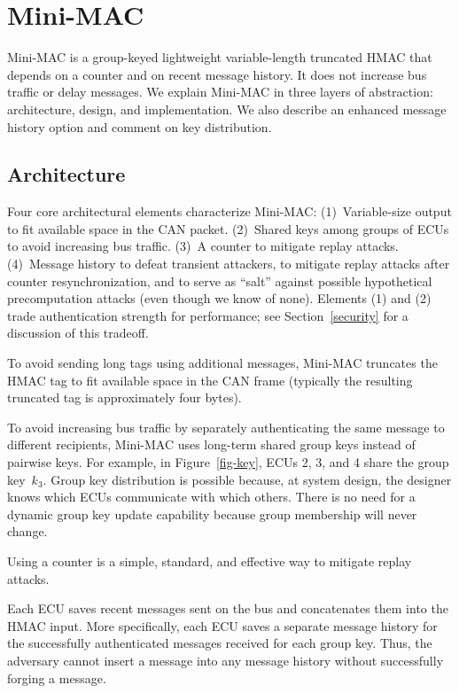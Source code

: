 \section{Mini-MAC}
\label{mini-mac}

Mini-MAC is a group-keyed lightweight variable-length truncated HMAC that
depends on a counter and on recent message history.  It does not increase
bus traffic or delay messages.  We explain Mini-MAC in three layers
of abstraction: architecture, design, and  implementation.
We also describe an enhanced message history option
and comment on key distribution.

\subsection{Architecture}
\label{arch}

Four core architectural elements characterize Mini-MAC:
(1)~Variable-size output to fit available space in the CAN packet.
(2)~Shared keys among groups of ECUs to avoid increasing bus traffic.
(3)~A counter to mitigate replay attacks.
(4)~Message history to defeat transient attackers, 
to mitigate replay attacks after counter resynchronization, 
and to serve as ``salt'' against possible hypothetical precomputation attacks 
(even though we know of none).
Elements (1) and (2) trade authentication strength for performance;  see
Section~\ref{security} for a discussion of this tradeoff.

To avoid sending long tags using additional messages, Mini-MAC truncates the
HMAC tag to fit available space in the CAN frame 
(typically the resulting truncated tag is approximately four bytes).  

To avoid increasing bus traffic by separately authenticating the same message to different recipients, 
Mini-MAC uses long-term shared group keys instead of pairwise keys.  For example, in Figure~\ref{fig-key}, ECUs
2, 3, and 4 share the group key~$k_3$.
Group key distribution is possible because, at system design, the designer knows which ECUs communicate with which others. 
There is no need for a dynamic group key update capability because group membership will never change.

Using a counter is a simple, standard, and effective way to mitigate replay attacks.  

Each ECU saves recent messages sent on the bus  and concatenates them into the HMAC input. 
More specifically, each ECU saves a separate message history for the 
successfully authenticated messages received for each group key.  
Thus, the adversary cannot insert a message into any message history without 
successfully forging a message.

